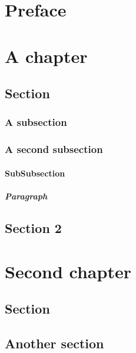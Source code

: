 \documentclass{book}
\begin{document}
\frontmatter

\chapter*{Preface}
\lipsum[1]

\cleardoublepage


\cleardoublepage

\tableofcontents

\mainmatter

\chapter{A chapter}
\startcontents[chapters]
\section{Section}
\lipsum[1]
\subsection{A subsection}
\lipsum[3]
\subsection{A second subsection}
\subsubsection{SubSubsection}
\paragraph{Paragraph}
\lipsum[4]
\section{Section 2}
\lipsum
\chapter{Second chapter}
\startcontents[chapters]
\section{Section}
\lipsum[2]
\section{Another section}
\lipsum
\end{document}
